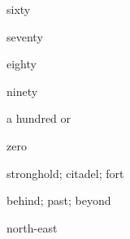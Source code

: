\begin{flashcard}{\LARGE sixty}
\LARGE {}
\end{flashcard}
\begin{flashcard}{\LARGE seventy}
\LARGE {}
\end{flashcard}
\begin{flashcard}{\LARGE eighty}
\LARGE {}
\end{flashcard}
\begin{flashcard}{\LARGE ninety}
\LARGE {}
\end{flashcard}
\begin{flashcard}{\LARGE a hundred}
\LARGE {} or 
\end{flashcard}
\begin{flashcard}{\LARGE zero}
\LARGE {}
\end{flashcard}
\begin{flashcard}{\LARGE stronghold; citadel; fort}
\LARGE {}
\end{flashcard}
\begin{flashcard}{\LARGE behind; past; beyond}
\LARGE {}
\end{flashcard}
\begin{flashcard}{\LARGE north-east}
\LARGE {}
\end{flashcard}

